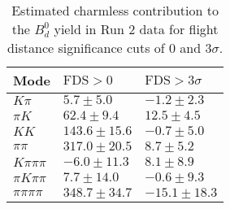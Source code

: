 \begin{table}[h]
  \centering
  \begin{tabular}{lll}
      \toprule
      Mode & $\mathrm{FDS} > 0$ & $\mathrm{FDS} > 3\sigma$ \\
      \midrule
      $K\pi$ & $5.7 \pm 5.0$ & $-1.2 \pm 2.3$ \\
      $\pi K$ & $62.4 \pm 9.4$ & $12.5 \pm 4.5$ \\
      $KK$ & $143.6 \pm 15.6$ & $-0.7 \pm 5.0$ \\
      $\pi\pi$ & $317.0 \pm 20.5$ & $8.7 \pm 5.2$ \\
      $K\pi\pi\pi$ & $-6.0 \pm 11.3$ & $8.1 \pm 8.9$ \\
      $\pi K\pi\pi$ & $7.7 \pm 14.0$ & $-0.6 \pm 9.3$ \\
      $\pi\pi\pi\pi$ & $348.7 \pm 34.7$ & $-15.1 \pm 18.3$ \\
      \bottomrule
  \end{tabular}
  \caption{\small Estimated charmless contribution to the $B^{0}_{d}$ yield in Run 2 data for flight distance significance cuts of 0  and $3\sigma$.}
\label{tab:charmless_yields_Bd_run_2}
\end{table}
